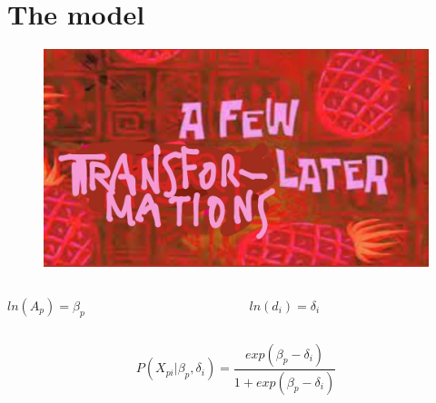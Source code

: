 \documentclass{beamer}
\begin{document}
\section{The model}
\begin{frame}
\begin{figure}
	\centering
	\includegraphics[width=0.5\linewidth]{later}
\end{figure}
\begin{columns}[T]
	\begin{column}{.5\linewidth}
		\centering
		$ln(A_p) = \beta_p$
	\end{column}
	\begin{column}{.5\linewidth}
	\centering
	$ln(d_i) = \delta_i$
\end{column}
\end{columns}

\vspace{3mm}
\begin{equation}
P(X_{pi}|\beta_p, \delta_i) = \dfrac{exp(\beta_p - \delta_i)}{1 + exp(\beta_p - \delta_i)}
\end{equation}
\end{frame}
\end{document}
